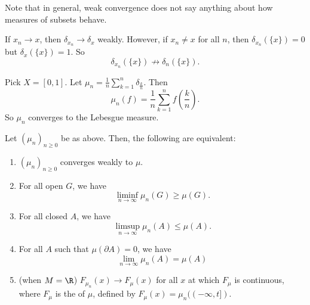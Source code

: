 \documentclass[a4paper]{article}
\begin{document}
Note that in general, weak convergence does not say anything about how measures of subsets behave.
\begin{eg}
  If $x_n \to x$, then $\delta_{x_n} \to \delta_x$ weakly. However, if $x_n \not= x$ for all $n$, then $\delta_{x_n} (\{x\}) = 0$ but $\delta_x(\{x\}) = 1$. So
  \[
    \delta_{x_n}(\{x\}) \not\to \delta_n(\{x\}).
  \]
\end{eg}

\begin{eg}
  Pick $X = [0, 1]$. Let $\mu_n = \frac{1}{n} \sum_{k = 1}^n \delta_{\frac{k}{n}}$. Then
  \[
    \mu_n(f) = \frac{1}{n} \sum_{k = 1}^n f\left(\frac{k}{n}\right).
  \]
  So $\mu_n$ converges to the Lebesgue measure.
\end{eg}

\begin{prop}
  Let $(\mu_n)_{n \geq 0}$ be as above. Then, the following are equivalent:
  \begin{enumerate}
    \item $(\mu_n)_{n \geq 0}$ converges weakly to $\mu$.
    \item For all open $G$, we have
      \[
        \liminf_{n \to \infty} \mu_n(G) \geq \mu(G).
      \]
    \item For all closed $A$, we have
      \[
        \limsup_{n \to \infty} \mu_n(A) \leq \mu(A).
      \]
    \item For all $A$ such that $\mu(\partial A) = 0$, we have
      \[
        \lim_{n \to \infty}\mu_n(A) = \mu(A)
      \]
    \item (when $M = \R$) $F_{\mu_n}(x) \to F_\mu(x)$ for all $x$ at which $F_\mu$ is continuous, where $F_\mu$ is the  of $\mu$, defined by $F_\mu(x) = \mu_n((-\infty, t])$.
  \end{enumerate}
\end{prop}
\end{document}
